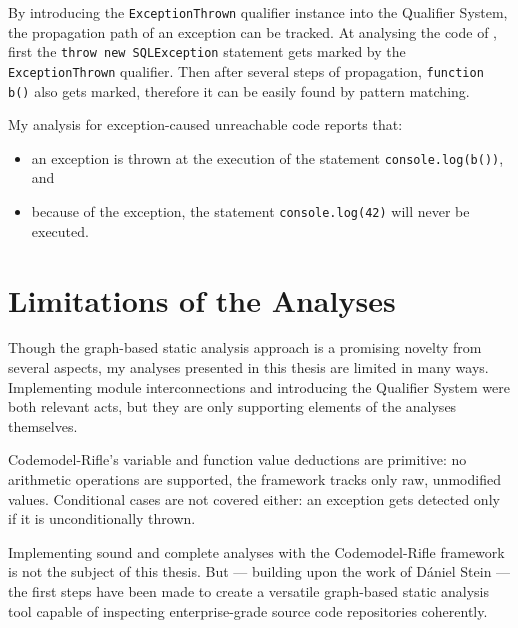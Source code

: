 By introducing the \lstinline{ExceptionThrown} qualifier instance into the Qualifier System, the propagation path of an exception can be tracked. At analysing the code of , first the \lstinline{throw new SQLException} statement gets marked by the \lstinline{ExceptionThrown} qualifier. Then after several steps of propagation, \lstinline{function b()} also gets marked, therefore it can be easily found by pattern matching.

My analysis for exception-caused unreachable code reports that:

\begin{itemize}
\item an exception is thrown at the execution of the statement \lstinline{console.log(b())}, and
\item because of the exception, the statement \lstinline{console.log(42)} will never be executed.
\end{itemize}


\section{Limitations of the Analyses}

Though the graph-based static analysis approach is a promising novelty from several aspects, my analyses presented in this thesis are limited in many ways. Implementing \es module interconnections and introducing the Qualifier System were both relevant acts, but they are only supporting elements of the analyses themselves.

Codemodel-Rifle's variable and function value deductions are primitive: no arithmetic operations are supported, the framework tracks only raw, unmodified values. Conditional cases are not covered either: an exception gets detected only if it is unconditionally thrown.

Implementing sound and complete analyses with the Codemodel-Rifle framework is not the subject of this thesis. But — building upon the work of Dániel Stein — the first steps have been made to create a versatile graph-based static analysis tool capable of inspecting enterprise-grade source code repositories coherently.